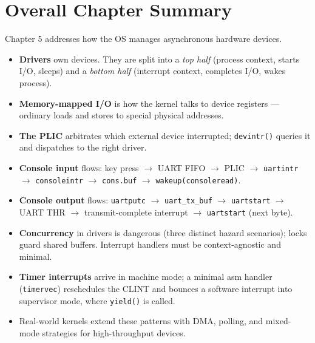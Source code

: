 \documentclass[11pt, a4paper]{article}
\begin{document}
\section{Overall Chapter Summary}

\begin{tcolorbox}[summary, title={Chapter 5 --- Complete Summary}]
Chapter 5 addresses how the OS manages asynchronous hardware devices.

\begin{itemize}[leftmargin=1.5em, itemsep=0.25em]
  \item \textbf{Drivers} own devices. They are split into a \emph{top half} (process context, starts I/O, sleeps) and a \emph{bottom half} (interrupt context, completes I/O, wakes process).
  \item \textbf{Memory-mapped I/O} is how the kernel talks to device registers --- ordinary loads and stores to special physical addresses.
  \item \textbf{The PLIC} arbitrates which external device interrupted; \lstinline|devintr()| queries it and dispatches to the right driver.
  \item \textbf{Console input} flows: key press $\to$ UART FIFO $\to$ PLIC $\to$ \lstinline|uartintr| $\to$ \lstinline|consoleintr| $\to$ \lstinline|cons.buf| $\to$ \lstinline|wakeup(consoleread)|.
  \item \textbf{Console output} flows: \lstinline|uartputc| $\to$ \lstinline|uart_tx_buf| $\to$ \lstinline|uartstart| $\to$ UART THR $\to$ transmit-complete interrupt $\to$ \lstinline|uartstart| (next byte).
  \item \textbf{Concurrency} in drivers is dangerous (three distinct hazard scenarios); locks guard shared buffers. Interrupt handlers must be context-agnostic and minimal.
  \item \textbf{Timer interrupts} arrive in machine mode; a minimal asm handler (\lstinline|timervec|) reschedules the CLINT and bounces a software interrupt into supervisor mode, where \lstinline|yield()| is called.
  \item Real-world kernels extend these patterns with DMA, polling, and mixed-mode strategies for high-throughput devices.
\end{itemize}
\end{tcolorbox}
\end{document}
